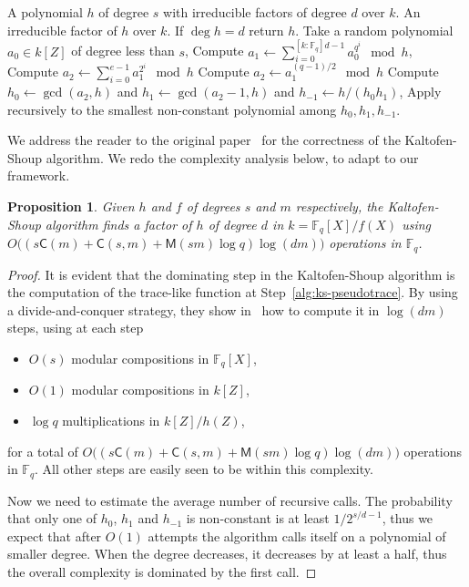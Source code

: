 \documentclass[12pt]{article}
\theoremstyle{plain}
\newtheorem{proposition}[theorem]{Proposition}
\theoremstyle{definition}
\def\F{\ensuremath{\mathbb{F}}}
\def\MM{\ensuremath{\mathsf{M}}}
\def\CC{\ensuremath{\mathsf{C}}}
\newcounter{algorithm}
\begin{document}
\begin{algorithm}
	\label{alg:ks}
	\begin{algorithmic}[1]
		\REQUIRE A polynomial $h$ of degree $s$ with irreducible factors of degree $d$ over $k$.
		\ENSURE An irreducible factor of $h$ over $k$.
		\STATE If $\deg h = d$ return $h$.
		\STATE Take a random polynomial $a_0\in k[Z]$ of degree less than $s$,
		\STATE\label{alg:ks-pseudotrace} Compute $\displaystyle a_1 
		\leftarrow \sum_{i=0}^{[k:\F_q]d-1} a_0^{q^i} \mod h$,
		\STATE\label{alg:ks:even} Compute $\displaystyle a_2 \leftarrow 
		\sum_{i=0}^{e-1} a_1^{2^i}\mod h$
		\ELSE
		\STATE\label{alg:ks:odd} Compute $a_2 \leftarrow a_1^{(q-1)/2}\mod h$
		\ENDIF
		\STATE\label{alg:ks:gcd} Compute $h_0\leftarrow\gcd(a_2,h)$ and 
		$h_1\leftarrow\gcd(a_2-1,h)$ and $h_{-1}\leftarrow h/(h_0h_1)$,
		\STATE Apply recursively to the smallest non-constant polynomial among 
		$h_0,h_1,h_{-1}$.
	\end{algorithmic}
\end{algorithm}

We address the reader to the original paper~\cite{kaltofen+shoup97}
for the correctness of the Kaltofen-Shoup algorithm. We redo the
complexity analysis below, to adapt to our framework.

\begin{proposition}
  Given $h$ and $f$ of degrees $s$ and $m$ respectively, the
  Kaltofen-Shoup algorithm finds a factor of $h$ of degree $d$ in
  $k=\F_q[X]/f(X)$ using
  $O\bigl((s\CC(m) + \CC(s,m) + \MM(sm)\log q)\log(dm)\bigr)$
  operations in $\F_q$.
\end{proposition}
\begin{proof}
	It is evident that the dominating step in the Kaltofen-Shoup
	algorithm is the computation of the trace-like function at
	Step~\ref{alg:ks-pseudotrace}. By using a divide-and-conquer
	strategy, they show in~\cite{kaltofen+shoup97} how to compute it in
	$\log (dm)$ steps, using at each step
	\begin{itemize}
		\item $O(s)$ modular compositions in $\F_q[X]$,
		\item $O(1)$ modular compositions in $k[Z]$,
		\item $\log q$ multiplications in $k[Z]/h(Z)$,
	\end{itemize}
	for a total of
        $O\bigl((s\CC(m) + \CC(s,m) + \MM(sm)\log q)\log(dm)\bigr)$
        operations in $\F_q$.  All other steps are easily seen to be
        within this complexity.
	
	Now we need to estimate the average number of recursive calls. The
	probability that only one of $h_0$, $h_1$ and $h_{-1}$ is
	non-constant is at least $1/2^{s/d-1}$, thus we expect that after
	$O(1)$ attempts the algorithm calls itself on a polynomial of
	smaller degree. When the degree decreases, it decreases by at least
	a half, thus the overall complexity is dominated by the first call.
\end{proof}
\end{document}
